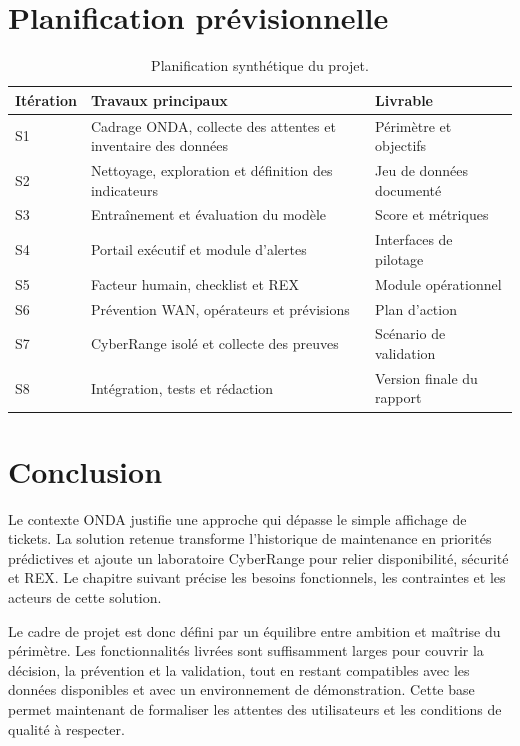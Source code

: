 \documentclass[12pt,a4paper,oneside]{report}
\begin{document}
\section{Planification prévisionnelle}

\begin{table}[H]
\centering
\small
\caption{Planification synthétique du projet.}
\begin{tabularx}{\textwidth}{B{4.0cm} P{5.0cm} X}
\toprule
Itération & Travaux principaux & Livrable\\
\midrule
S1 & Cadrage ONDA, collecte des attentes et inventaire des données & Périmètre et objectifs\\
S2 & Nettoyage, exploration et définition des indicateurs & Jeu de données documenté\\
S3 & Entraînement et évaluation du modèle & Score et métriques\\
S4 & Portail exécutif et module d’alertes & Interfaces de pilotage\\
S5 & Facteur humain, checklist et REX & Module opérationnel\\
S6 & Prévention WAN, opérateurs et prévisions & Plan d’action\\
S7 & CyberRange isolé et collecte des preuves & Scénario de validation\\
S8 & Intégration, tests et rédaction & Version finale du rapport\\
\bottomrule
\end{tabularx}
\end{table}

\section{Conclusion}

Le contexte ONDA justifie une approche qui dépasse le simple affichage de tickets. La solution retenue transforme l’historique de maintenance en priorités prédictives et ajoute un laboratoire CyberRange pour relier disponibilité, sécurité et REX. Le chapitre suivant précise les besoins fonctionnels, les contraintes et les acteurs de cette solution.

Le cadre de projet est donc défini par un équilibre entre ambition et maîtrise du périmètre. Les fonctionnalités livrées sont suffisamment larges pour couvrir la décision, la prévention et la validation, tout en restant compatibles avec les données disponibles et avec un environnement de démonstration. Cette base permet maintenant de formaliser les attentes des utilisateurs et les conditions de qualité à respecter.
\end{document}
